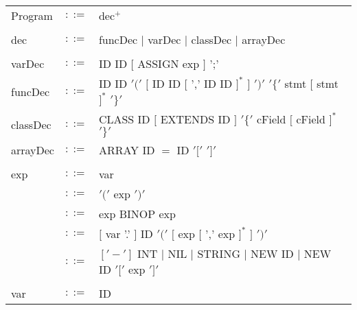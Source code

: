 \documentclass{article}
\begin{document}
\newpage
\begin{table}[h]
\centering
\begin{tabular}{ l c l }
Program  & $::=$ & dec$^{+}$ \\
\\
dec      & $::=$ & funcDec $|$ varDec $|$ classDec $|$ arrayDec \\
\\
varDec   & $::=$ & ID ID $[$ ASSIGN exp $]$ ';' \\
funcDec  & $::=$ & ID ID $'('$ $[$ ID ID $[$ ',' ID ID $]^{*}$ $]$ $')'$ %
                   $'\{'$ stmt   $[$ stmt $]^{*}$ $'\}'$                 \\
classDec & $::=$ & CLASS ID $[$ EXTENDS ID $]$ $'\{'$ cField $[$ cField $]^{*}$ $'\}'$ \\
arrayDec & $::=$ & ARRAY ID $=$ ID $'['$ $']'$ \\
\\
exp      & $::=$ & var                                                            \\
         & $::=$ & $'('$ exp $')'$                                                \\
         & $::=$ & exp BINOP exp                                                  \\
         & $::=$ & $[$ var '.' $]$ ID $'('$ $[$ exp $[$ ',' exp $]^{*}$ $]$ $')'$ \\
         & $::=$ & $['-']$ INT $|$ NIL $|$ STRING $|$ NEW ID $|$ NEW ID $'['$ exp $']'$ \\
\\
var      & $::=$ & ID                  \\

\end{tabular}
\end{table}
\end{document}
